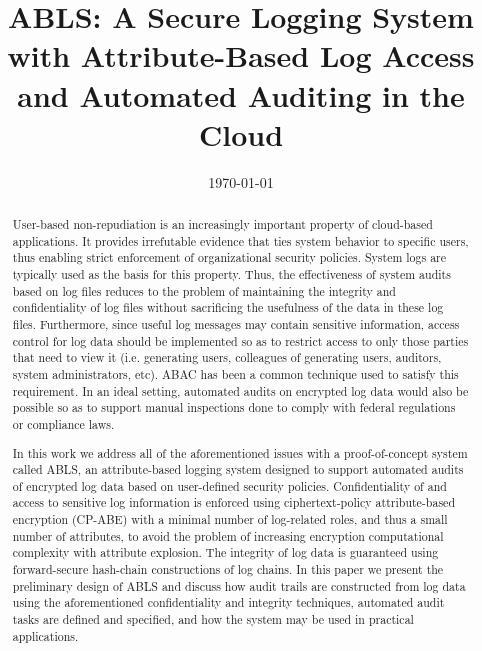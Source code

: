 \documentclass{sig-alternate}
\begin{document}
\title{ABLS: A Secure Logging System with Attribute-Based Log Access and Automated Auditing in the Cloud}
\author{
}
\date{\today}
\maketitle
\begin{abstract}
User-based non-repudiation is an increasingly important property of cloud-based applications. It provides irrefutable 
evidence that ties system behavior to specific users, thus enabling strict enforcement of organizational security policies. 
System logs are typically used as the basis for this property. Thus, the effectiveness of system audits based on log files 
reduces to the problem of maintaining the integrity and confidentiality of log files without sacrificing the usefulness
of the data in these log files. Furthermore, since useful log messages may contain sensitive information, 
access control for log 
data should be implemented so as to restrict access to only those parties that need to view it (i.e. generating users,
colleagues of generating users, auditors, system administrators, etc). ABAC has been a common technique used to
satisfy this requirement. 
In an ideal setting, automated audits on encrypted log data would also be possible so as to support manual
inspections done to comply with federal regulations or compliance laws.

In this work we address all of the aforementioned issues with a proof-of-concept system called ABLS, an attribute-based logging system designed
to support automated audits of encrypted log data based on user-defined security policies. Confidentiality of and access to
sensitive log information is enforced using ciphertext-policy attribute-based encryption (CP-ABE) with a minimal number
of log-related roles, and thus a small number of attributes, to avoid the problem of increasing encryption computational
complexity with attribute explosion. The integrity of log data is guaranteed using forward-secure hash-chain constructions of log chains. In this paper we present the preliminary design of ABLS and discuss how audit trails are 
constructed from log data using the aforementioned confidentiality and integrity techniques, automated audit tasks are defined and specified, and how the system may be used in practical applications.
\end{abstract}
\end{document}
